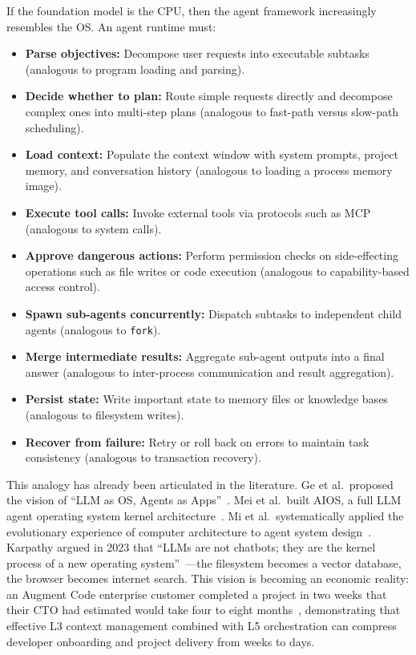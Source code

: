 \documentclass[11pt,a4paper]{article}
\begin{document}
If the foundation model is the CPU, then the agent framework increasingly resembles the OS.
An agent runtime must:
\begin{itemize}[nosep]
\item \textbf{Parse objectives:} Decompose user requests into executable subtasks (analogous to program loading and parsing).
\item \textbf{Decide whether to plan:} Route simple requests directly and decompose complex ones into multi-step plans (analogous to fast-path versus slow-path scheduling).
\item \textbf{Load context:} Populate the context window with system prompts, project memory, and conversation history (analogous to loading a process memory image).
\item \textbf{Execute tool calls:} Invoke external tools via protocols such as MCP (analogous to system calls).
\item \textbf{Approve dangerous actions:} Perform permission checks on side-effecting operations such as file writes or code execution (analogous to capability-based access control).
\item \textbf{Spawn sub-agents concurrently:} Dispatch subtasks to independent child agents (analogous to \texttt{fork}).
\item \textbf{Merge intermediate results:} Aggregate sub-agent outputs into a final answer (analogous to inter-process communication and result aggregation).
\item \textbf{Persist state:} Write important state to memory files or knowledge bases (analogous to filesystem writes).
\item \textbf{Recover from failure:} Retry or roll back on errors to maintain task consistency (analogous to transaction recovery).
\end{itemize}

This analogy has already been articulated in the literature.
Ge et al.\ proposed the vision of ``LLM as OS, Agents as Apps''~\cite{ge2023llmos}.
Mei et al.\ built AIOS, a full LLM agent operating system kernel architecture~\cite{mei2024aios}.
Mi et al.\ systematically applied the evolutionary experience of computer architecture to agent system design~\cite{mi2025llmagentscomputersystems}.
Karpathy argued in 2023 that ``LLMs are not chatbots; they are the kernel process of a new operating system''~\cite{karpathy2023llmos}---the filesystem becomes a vector database, the browser becomes internet search.
This vision is becoming an economic reality: an Augment Code enterprise customer completed a project in two weeks that their CTO had estimated would take four to eight months~\cite{anthropic2026agenticreport}, demonstrating that effective L3 context management combined with L5 orchestration can compress developer onboarding and project delivery from weeks to days.
\end{document}
